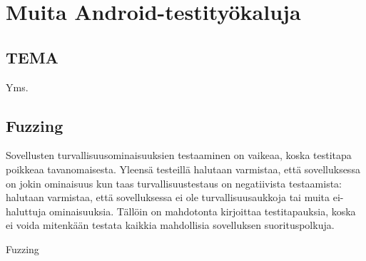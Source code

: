 \section{Muita Android-testityökaluja}

\subsection{TEMA}

Yms.

\subsection{Fuzzing}

Sovellusten turvallisuusominaisuuksien testaaminen on vaikeaa, koska testitapa poikkeaa tavanomaisesta. Yleensä testeillä halutaan varmistaa, että sovelluksessa on jokin ominaisuus kun taas turvallisuustestaus on negatiivista testaamista: halutaan varmistaa, että sovelluksessa ei ole turvallisuusaukkoja tai muita ei-haluttuja ominaisuuksia. Tällöin on mahdotonta kirjoittaa testitapauksia, koska ei voida mitenkään testata kaikkia mahdollisia sovelluksen suorituspolkuja.\cite{mahmoodetal12}

Fuzzing